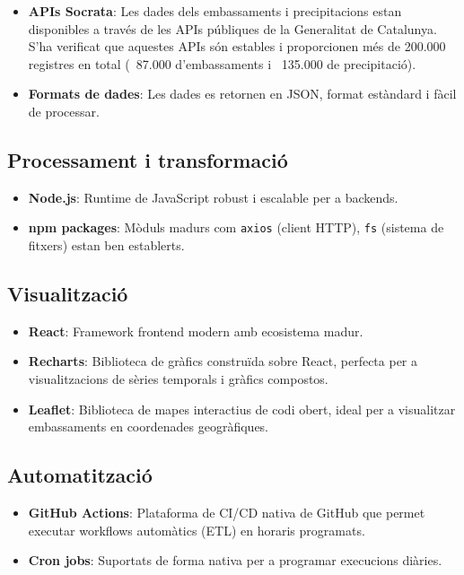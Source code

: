 \begin{itemize}
    \item \textbf{APIs Socrata}: Les dades dels embassaments i precipitacions estan disponibles a través de les APIs públiques de la Generalitat de Catalunya. S'ha verificat que aquestes APIs són estables i proporcionen més de 200.000 registres en total (~87.000 d'embassaments i ~135.000 de precipitació).
    \item \textbf{Formats de dades}: Les dades es retornen en JSON, format estàndard i fàcil de processar.
\end{itemize}

\subsection{Processament i transformació}

\begin{itemize}
    \item \textbf{Node.js}: Runtime de JavaScript robust i escalable per a backends.
    \item \textbf{npm packages}: Mòduls madurs com \texttt{axios} (client HTTP), \texttt{fs} (sistema de fitxers) estan ben establerts.
\end{itemize}

\subsection{Visualització}

\begin{itemize}
    \item \textbf{React}: Framework frontend modern amb ecosistema madur.
    \item \textbf{Recharts}: Biblioteca de gràfics construïda sobre React, perfecta per a visualitzacions de sèries temporals i gràfics compostos.
    \item \textbf{Leaflet}: Biblioteca de mapes interactius de codi obert, ideal per a visualitzar embassaments en coordenades geogràfiques.
\end{itemize}

\subsection{Automatització}

\begin{itemize}
    \item \textbf{GitHub Actions}: Plataforma de CI/CD nativa de GitHub que permet executar workflows automàtics (ETL) en horaris programats.
    \item \textbf{Cron jobs}: Suportats de forma nativa per a programar execucions diàries.
\end{itemize}

